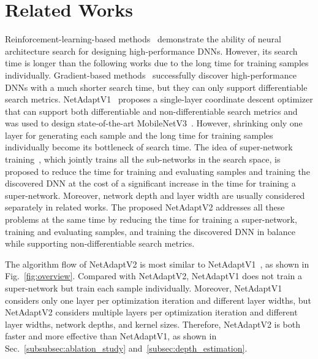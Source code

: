\section{Related Works}
\label{sec:related_works}

Reinforcement-learning-based methods~\cite{zoph2017nasreinforcement, zoph2018nasnet, Tan2018MnasNetPN, Chen2020MnasFPNLL, Tan2019EfficientNet} demonstrate the ability of neural architecture search for designing high-performance DNNs. However, its search time is longer than the following works due to the long time for training samples individually. Gradient-based methods~\cite{gordon2018morphnet, liu2018darts, wu2018fbnet, cai2018proxylessnas, stamoulis2019singlepath, stamoulis2019singlepathautoml, Mei2020AtomNAS, Xu2020PC-DARTS} successfully discover high-performance DNNs with a much shorter search time, but they can only support differentiable search metrics. NetAdaptV1~\cite{eccv2018-netadapt} proposes a single-layer coordinate descent optimizer that can support both differentiable and non-differentiable search metrics and was used to design state-of-the-art MobileNetV3~\cite{Howard_2019_ICCV}. However, shrinking only one layer for generating each sample and the long time for training samples individually become its bottleneck of search time. The idea of super-network training~\cite{autoslim_arxiv, cai2020once, yu2020bignas}, which jointly trains all the sub-networks in the search space, is proposed to reduce the time for training and evaluating samples and training the discovered DNN at the cost of a significant increase in the time for training a super-network. Moreover, network depth and layer width are usually considered separately in related works. The proposed NetAdaptV2 addresses all these problems at the same time by reducing the time for training a super-network, training and evaluating samples, and training the discovered DNN in balance while supporting non-differentiable search metrics.

The algorithm flow of NetAdaptV2 is most similar to NetAdaptV1~\cite{eccv2018-netadapt}, as shown in Fig.~\ref{fig:overview}. Compared with NetAdaptV2, NetAdaptV1 does not train a super-network but train each sample individually. Moreover, NetAdaptV1 considers only one layer per optimization iteration and different layer widths, but NetAdaptV2 considers multiple layers per optimization iteration and different layer widths, network depths, and kernel sizes. Therefore, NetAdaptV2 is both faster and more effective than NetAdaptV1, as shown in Sec.~\ref{subsubsec:ablation_study} and~\ref{subsec:depth_estimation}.

